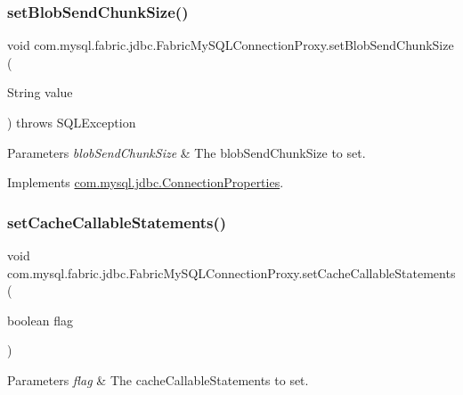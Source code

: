 \subsubsection{\texorpdfstring{set\+Blob\+Send\+Chunk\+Size()}{setBlobSendChunkSize()}}
{\footnotesize\ttfamily void com.\+mysql.\+fabric.\+jdbc.\+Fabric\+My\+S\+Q\+L\+Connection\+Proxy.\+set\+Blob\+Send\+Chunk\+Size (\begin{DoxyParamCaption}\item[{String}]{value }\end{DoxyParamCaption}) throws S\+Q\+L\+Exception}


\begin{DoxyParams}{Parameters}
{\em blob\+Send\+Chunk\+Size} & The blob\+Send\+Chunk\+Size to set. \\
\hline
\end{DoxyParams}


Implements \mbox{\hyperlink{interfacecom_1_1mysql_1_1jdbc_1_1_connection_properties_ab16063397e021c5f18662127d274d4d5}{com.\+mysql.\+jdbc.\+Connection\+Properties}}.

\mbox{\label{classcom_1_1mysql_1_1fabric_1_1jdbc_1_1_fabric_my_s_q_l_connection_proxy_a47bfcdd9978dce9581d620b99e9cadff}} 
\subsubsection{\texorpdfstring{set\+Cache\+Callable\+Statements()}{setCacheCallableStatements()}}
{\footnotesize\ttfamily void com.\+mysql.\+fabric.\+jdbc.\+Fabric\+My\+S\+Q\+L\+Connection\+Proxy.\+set\+Cache\+Callable\+Statements (\begin{DoxyParamCaption}\item[{boolean}]{flag }\end{DoxyParamCaption})}


\begin{DoxyParams}{Parameters}
{\em flag} & The cache\+Callable\+Statements to set. \\
\hline
\end{DoxyParams}


